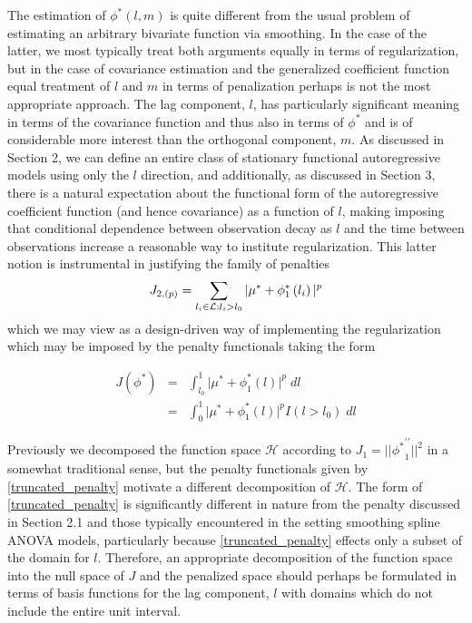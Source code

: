 \documentclass[12pt]{article}
\begin{document}
The estimation of $\phi^*\left(l,m\right)$ is quite different from the usual problem of estimating an arbitrary bivariate function via smoothing. In the case of the latter, we most typically treat both arguments equally in terms of regularization, but in the case of covariance estimation and the generalized coefficient function equal treatment of $l$ and $m$ in terms of penalization perhaps is not the most appropriate approach. The lag component, $l$, has particularly significant meaning in terms of the covariance function and thus also in terms of $\phi^*$ and is of considerable more interest than the orthogonal component, $m$. As discussed in Section 2, we can define an entire class of stationary functional autoregressive models using only the $l$ direction, and additionally, as discussed in Section 3, there is a natural expectation about the functional form of the autoregressive coefficient function (and hence covariance) as a function of $l$, making imposing that conditional dependence between observation decay as $l$ and the time between observations increase a reasonable way to institute regularization.
This latter notion is instrumental in justifying the family of penalties
\[
J_{2,\left(p\right)} = \sum_{\relsize{-2} l_i \in \mathcal{L}: l_i > l_0} \vert \mu^* + \phi^*_1\left(l_i\right) \vert^p 
\]
\noindent
which we may view as a design-driven way of implementing the regularization which may be imposed by the penalty functionals taking the form

\begin{eqnarray} \nonumber
J\left(\phi^*\right) &=& \int_{l_0}^1 \vert \mu^* + \phi^*_1\left(l\right) \vert^p\; dl\\
&=& \int_{0}^1 \vert \mu^* + \phi^*_1\left(l\right) \vert^p I\left(l > l_0\right) \; dl \label{truncated_penalty}
\end{eqnarray}

Previously we decomposed the function space $\mathcal{H}$ according to $J_1 = \vert \vert {\phi^*}^{\prime\prime}_1 \vert \vert^2$ in a somewhat traditional sense, but the penalty functionals given by \eqref{truncated_penalty} motivate a different decomposition of $\mathcal{H}$. The form of \eqref{truncated_penalty} is significantly different in nature from the penalty discussed in Section 2.1 and those typically encountered in the setting smoothing spline ANOVA models, particularly because \eqref{truncated_penalty} effects only a subset of the domain for $l$. Therefore, an appropriate decomposition of the function space into the null space of $J$ and the penalized space should perhaps be formulated in terms of basis functions for the lag component, $l$ with domains which do not include the entire unit interval.
\end{document}

